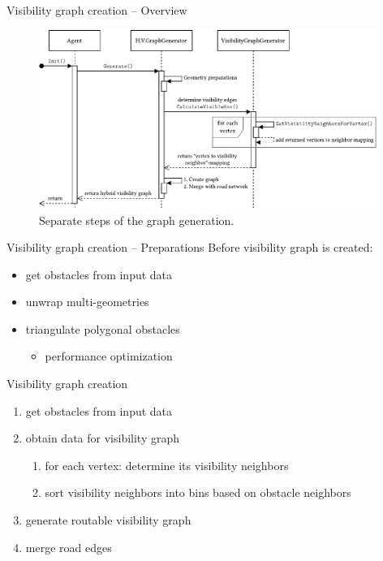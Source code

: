 \documentclass[xcolor={x11names}]{beamer}
\renewcommand{\n}{\hfill\\[0.5ex]}
\newenvironment{figcenter}
{%
	\parskip=0pt%
	\par%
	\nopagebreak%
	\centering%
}%
{%
	\par%
	\noindent%
	\ignorespacesafterend%
}
\begin{document}
		\begin{frame}{Visibility graph creation -- Overview}
			\begin{figure}[t]
				\begin{figcenter}
					\includegraphics[width=0.98\textwidth]{images/components-sequence-generation-short.pdf}
				\end{figcenter}
				\caption{Separate steps of the graph generation.}
			\end{figure}
		\end{frame}
		
		\begin{frame}{Visibility graph creation -- Preparations}
			Before visibility graph is created:\n
			\begin{itemize}
				\item get obstacles from input data
				\item unwrap multi-geometries
				\item triangulate polygonal obstacles
				\begin{itemize}
					\item[\textrightarrow] performance optimization
				\end{itemize}
			\end{itemize}
		\end{frame}
		
		\begin{frame}{Visibility graph creation}
			\begin{enumerate}
				\item get obstacles from input data
				\item obtain data for visibility graph
				\begin{enumerate}
					\item for each vertex: determine its visibility neighbors
					\item sort visibility neighbors into bins based on obstacle neighbors
				\end{enumerate}
				\item generate routable visibility graph
				\item merge road edges
			\end{enumerate}
		\end{frame}
		
\end{document}
